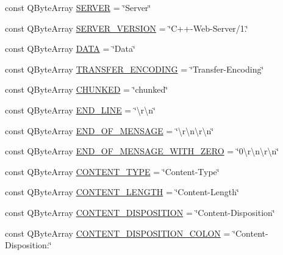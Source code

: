 \begin{DoxyCompactItemize}
\item 
const Q\+Byte\+Array \hyperlink{namespace_h_t_t_p_a8c24342747a8ed64e557615ee1bc62e5}{S\+E\+R\+V\+ER} = \char`\"{}Server\char`\"{}
\item 
const Q\+Byte\+Array \hyperlink{namespace_h_t_t_p_a950273d2eefb7058762a583117cd1706}{S\+E\+R\+V\+E\+R\+\_\+\+V\+E\+R\+S\+I\+ON} = \char`\"{}C++-\/Web-\/Server/1.\char`\"{}
\item 
const Q\+Byte\+Array \hyperlink{namespace_h_t_t_p_aca1d4a3f9ecf60091abdd8108139853d}{D\+A\+TA} = \char`\"{}Data\char`\"{}
\item 
const Q\+Byte\+Array \hyperlink{namespace_h_t_t_p_a9872687357d93db7cf1d097678009710}{T\+R\+A\+N\+S\+F\+E\+R\+\_\+\+E\+N\+C\+O\+D\+I\+NG} = \char`\"{}Transfer-\/Encoding\char`\"{}
\item 
const Q\+Byte\+Array \hyperlink{namespace_h_t_t_p_add0083c3bffa0757900a473cbea9e7f5}{C\+H\+U\+N\+K\+ED} = \char`\"{}chunked\char`\"{}
\item 
const Q\+Byte\+Array \hyperlink{namespace_h_t_t_p_a5f1ce6ac823c50481d9ef6cb8ec27338}{E\+N\+D\+\_\+\+L\+I\+NE} = \char`\"{}\textbackslash{}r\textbackslash{}n\char`\"{}
\item 
const Q\+Byte\+Array \hyperlink{namespace_h_t_t_p_a8182c2118f364228ce6c4eb5eeba33df}{E\+N\+D\+\_\+\+O\+F\+\_\+\+M\+E\+N\+S\+A\+GE} = \char`\"{}\textbackslash{}r\textbackslash{}n\textbackslash{}r\textbackslash{}n\char`\"{}
\item 
const Q\+Byte\+Array \hyperlink{namespace_h_t_t_p_a0e917d325f79c26814f4774783901e26}{E\+N\+D\+\_\+\+O\+F\+\_\+\+M\+E\+N\+S\+A\+G\+E\+\_\+\+W\+I\+T\+H\+\_\+\+Z\+E\+RO} = \char`\"{}0\textbackslash{}r\textbackslash{}n\textbackslash{}r\textbackslash{}n\char`\"{}
\item 
const Q\+Byte\+Array \hyperlink{namespace_h_t_t_p_a9494cde5d3c65edb6c776a0601bb0c9a}{C\+O\+N\+T\+E\+N\+T\+\_\+\+T\+Y\+PE} = \char`\"{}Content-\/Type\char`\"{}
\item 
const Q\+Byte\+Array \hyperlink{namespace_h_t_t_p_abe6edaae620af33de9489c6957d86a3a}{C\+O\+N\+T\+E\+N\+T\+\_\+\+L\+E\+N\+G\+TH} = \char`\"{}Content-\/Length\char`\"{}
\item 
const Q\+Byte\+Array \hyperlink{namespace_h_t_t_p_ae7b8f72e0ef45b55d59d934ad9b5bcf0}{C\+O\+N\+T\+E\+N\+T\+\_\+\+D\+I\+S\+P\+O\+S\+I\+T\+I\+ON} = \char`\"{}Content-\/Disposition\char`\"{}
\item 
const Q\+Byte\+Array \hyperlink{namespace_h_t_t_p_acf64facfac775327f68199dbc047592c}{C\+O\+N\+T\+E\+N\+T\+\_\+\+D\+I\+S\+P\+O\+S\+I\+T\+I\+O\+N\+\_\+\+C\+O\+L\+ON} = \char`\"{}Content-\/Disposition\+:\char`\"{}

\end{DoxyCompactItemize}

